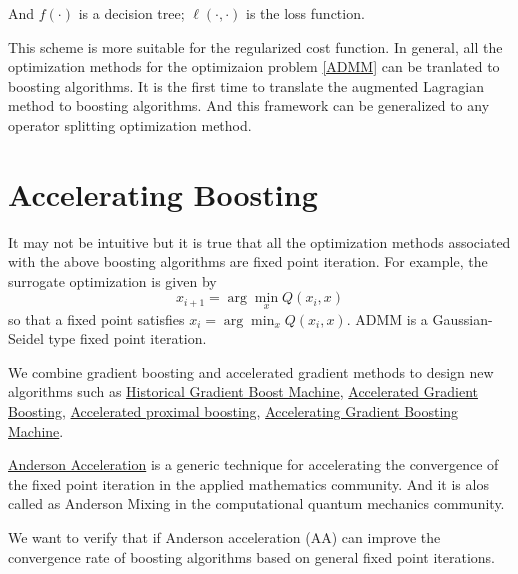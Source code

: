 \documentclass[UTF8]{article}
\begin{document}
And $f(\cdot)$ is a decision tree; $\ell(\cdot, \cdot)$ is the loss function.

This scheme is more suitable for the regularized cost function.
In general, all the optimization methods for the optimizaion problem \ref{ADMM} can be tranlated to 
boosting algorithms.
It is the first time to translate the augmented Lagragian method to boosting algorithms.
And this framework can be generalized to any operator splitting optimization method.

\section{Accelerating Boosting}

It may not be intuitive but it is true that all the optimization methods associated with the  above boosting algorithms are fixed point iteration.
For example, the surrogate optimization is given by
$$x_{i+1}=\arg\min_{x}Q(x_i, x)$$
so that a fixed point satisfies $x_{i}=\arg\min_{x}Q(x_i, x)$. 
ADMM is a Gaussian-Seidel type fixed point iteration.

We combine gradient boosting and  accelerated gradient methods to design new algorithms such as
\href{https://easychair.org/publications/open/pCtK}{Historical Gradient Boost Machine},
\href{https://arxiv.org/abs/1803.02042}{Accelerated Gradient Boosting},
\href{https://arxiv.org/abs/1808.09670}{Accelerated proximal boosting},
\href{https://arxiv.org/abs/1903.08708}{Accelerating Gradient Boosting Machine}.

\href{https://dash.harvard.edu/bitstream/handle/1/34773632/Extrapolation%20Algorithm%20w%20Appendix.pdf}{Anderson Acceleration}
is a generic technique for accelerating the convergence of the fixed point iteration in the applied mathematics community.  
And it is alos called as  Anderson Mixing in the computational quantum mechanics community.
 

We want to verify that if Anderson acceleration (AA) can improve the convergence rate of 
boosting algorithms based on general fixed point iterations.
\end{document}
